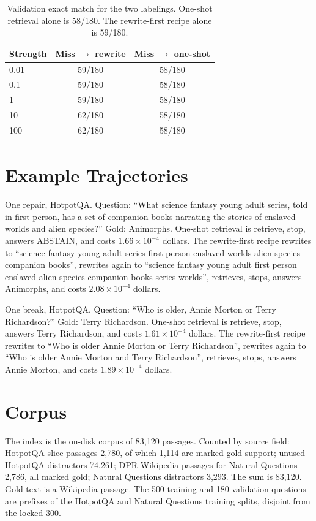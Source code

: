 \documentclass[letterpaper]{article}
\begin{document}
\begin{table}[t]
\centering
\small
\begin{tabular}{lcc}
\toprule
Strength & Miss \(\to\) rewrite & Miss \(\to\) one-shot \\
\midrule
0.01 & 59/180 & 58/180 \\
0.1 & 59/180 & 58/180 \\
1 & 59/180 & 58/180 \\
10 & 62/180 & 58/180 \\
100 & 62/180 & 58/180 \\
\bottomrule
\end{tabular}
\caption{Validation exact match for the two labelings. One-shot retrieval alone is 58/180. The rewrite-first recipe alone is 59/180.}
\label{tab:grid}
\end{table}

\FloatBarrier
\section{Example Trajectories}
One repair, HotpotQA. Question: ``What science fantasy young adult series, told in first person, has a set of companion books narrating the stories of enslaved worlds and alien species?'' Gold: Animorphs. One-shot retrieval is retrieve, stop, answers ABSTAIN, and costs \(1.66\times 10^{-4}\) dollars. The rewrite-first recipe rewrites to ``science fantasy young adult series first person enslaved worlds alien species companion books'', rewrites again to ``science fantasy young adult first person enslaved alien species companion books series worlds'', retrieves, stops, answers Animorphs, and costs \(2.08\times 10^{-4}\) dollars.

One break, HotpotQA. Question: ``Who is older, Annie Morton or Terry Richardson?'' Gold: Terry Richardson. One-shot retrieval is retrieve, stop, answers Terry Richardson, and costs \(1.61\times 10^{-4}\) dollars. The rewrite-first recipe rewrites to ``Who is older Annie Morton or Terry Richardson'', rewrites again to ``Who is older Annie Morton and Terry Richardson'', retrieves, stops, answers Annie Morton, and costs \(1.89\times 10^{-4}\) dollars.

\FloatBarrier
\section{Corpus}
The index is the on-disk corpus of 83{,}120 passages. Counted by source field: HotpotQA slice passages 2{,}780, of which 1{,}114 are marked gold support; unused HotpotQA distractors 74{,}261; DPR Wikipedia passages for Natural Questions 2{,}786, all marked gold; Natural Questions distractors 3{,}293. The sum is 83{,}120. Gold text is a Wikipedia passage. The 500 training and 180 validation questions are prefixes of the HotpotQA and Natural Questions training splits, disjoint from the locked 300.
\end{document}

